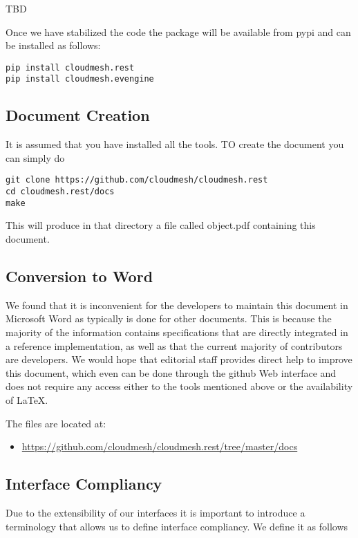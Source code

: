 \documentclass[9pt,twocolumn,twoside]{styles/osajnl}
\begin{document}
TBD

Once we have stabilized the code the package will be available from
pypi and can be installed as follows:

\begin{Verbatim}
pip install cloudmesh.rest
pip install cloudmesh.evengine
\end{Verbatim} 

\subsection{Document Creation}

It is assumed that you have installed all the tools. TO create the
document you can simply do

\begin{Verbatim}
git clone https://github.com/cloudmesh/cloudmesh.rest
cd cloudmesh.rest/docs
make
\end{Verbatim}

This will produce in that directory a file called object.pdf
containing this document.

\subsection{Conversion to Word}

We found that it is inconvenient for the developers to maintain this
document in Microsoft Word as typically is done for other
documents. This is because the majority of the information contains
specifications that are directly integrated in a reference
implementation, as well as that the current majority of contributors
are developers. We would hope that editorial staff provides direct
help to improve this document, which even can be done through the
github Web interface and does not require any access either to the
tools mentioned above or the availability of \LaTeX.

The files are located at:

\begin{itemize}
\item \url{https://github.com/cloudmesh/cloudmesh.rest/tree/master/docs}
\end{itemize}

\subsection{Interface Compliancy}

Due to the extensibility of our interfaces it is important to
introduce a terminology that allows us to define interface
compliancy. We define it as follows
\end{document}
